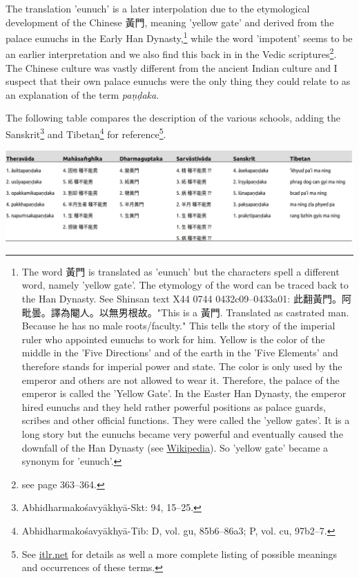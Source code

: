 The translation 'eunuch' is a later interpolation due to the etymological development of the Chinese 黃門, meaning 'yellow gate' and derived from the palace eunuchs in the Early Han Dynasty,\footnote{The word 黃門 is translated as 'eunuch' but the characters spell a different word, namely 'yellow gate'. The etymology of the word can be traced back to the Han Dynasty. See Shinsan text X44 0744 0432c09–0433a01: 此翻黃門。阿毗曇。譯為閹人。以無男根故。"This is a 黃門. Translated as castrated man. Because he has no male roots/faculty." This tells the story of the imperial ruler who appointed eunuchs to work for him. Yellow is the color of the middle in the 'Five Directions' and of the earth in the 'Five Elements' and therefore stands for imperial power and state. The color is only used by the emperor and others are not allowed to wear it. Therefore, the palace of the emperor is called the 'Yellow Gate'. In the Easter Han Dynasty, the emperor hired eunuchs and they held rather powerful positions as palace guards, scribes and other official functions. They were called the 'yellow gates'. It is a long story but the eunuchs became very powerful and eventually caused the downfall of the Han Dynasty (see \href{https://en.wikipedia.org/wiki/Han_dynasty}{Wikipedia}). So 'yellow gate' became a synonym for 'eunuch'.} while the word 'impotent' seems to be an earlier interpretation and we also find this back in in the Vedic scriptures\footnote{see \cite{zwilling} page 363–364.}. The Chinese culture was vastly different from the ancient Indian culture and I suspect that their own palace eunuchs were the only thing they could relate to as an explanation of the term {\em paṇḍaka}.

The following table compares the description of the various schools, adding the Sanskrit\footnote{Abhidharmakośavyākhyā-Skt: 94, 15–25.} and Tibetan\footnote{Abhidharmakośavyākhyā-Tib: D, vol. gu, 85b6–86a3; P, vol. cu, 97b2–7.} for reference\footnote{See \href{http://www.itlr.net/hwid:281142}{itlr.net} for details as well a more complete listing of possible meanings and occurrences of these terms.}.

\bigskip
\includegraphics[width=\linewidth]{pandaka.jpg}
\label{pandaka}
\medskip

